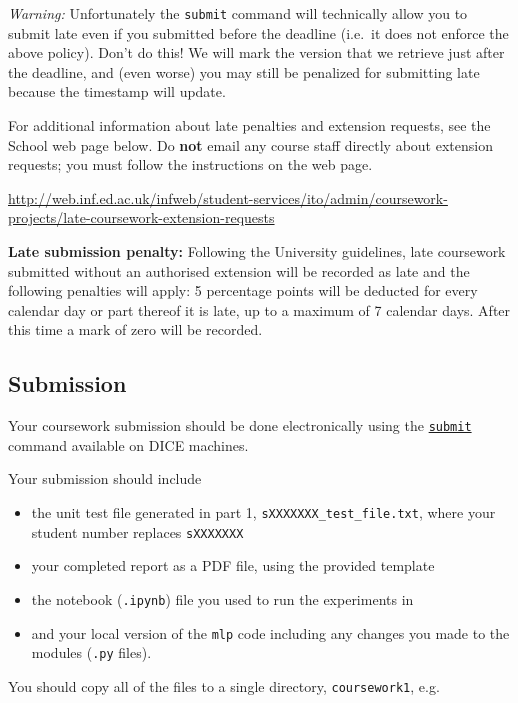 \documentclass[11pt,]{article}
\begin{document}
{\em Warning:} Unfortunately the \verb+submit+ command will technically
allow you to submit late even if you submitted before the deadline
(i.e.\ it does not enforce the above policy). Don't do this! We will
mark the version that we retrieve just after the deadline, and (even
worse) you may still be penalized for submitting late because the
timestamp will update.

For additional information about late penalties and extension
requests, see the School web page below. Do {\bf not} email any course
staff directly about extension requests; you must follow the
instructions on the web page.

\url{http://web.inf.ed.ac.uk/infweb/student-services/ito/admin/coursework-projects/late-coursework-extension-requests}

\textbf{Late submission penalty:}  
Following the University guidelines, 
late coursework submitted without an authorised extension will be
recorded as late and the following penalties will apply: 5
percentage points will be deducted for every calendar day or part
thereof it is late, up to a maximum of 7 calendar days. After this
time a mark of zero will be recorded.

\subsection{Submission}
\label{sec:submission}

Your coursework submission should be done electronically using the
\href{http://computing.help.inf.ed.ac.uk/submit}{\texttt{submit}}
command available on DICE machines.

Your submission should include

\begin{itemize}
\itemsep1pt\parskip0pt
\item
  the unit test file generated in part 1, \verb+sXXXXXXX_test_file.txt+, where your student number replaces \verb+sXXXXXXX+
\item
  your completed report as a PDF file, using the provided template
\item
  the notebook (\verb+.ipynb+) file you used to run the experiments in
\item
  and your local version of the \texttt{mlp} code including any changes
  you made to the modules (\texttt{.py} files).
\end{itemize}

You should copy all of the files to a single directory, \verb+coursework1+, e.g.
\end{document}
